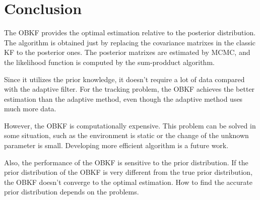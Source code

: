 \section{Conclusion}\label{sec:conclusion}

The OBKF provides the optimal estimation relative to the posterior distribution. The algorithm is obtained just by replacing the covariance matrixes in the classic KF to the posterior ones. The posterior matrixes are estimated by MCMC, and the likelihood function is computed by the sum-prodduct algorithm. 

Since it utilizes the prior knowledge, it doesn't require a lot of data compared with the adaptive filter. For the tracking problem, the OBKF achieves the better estimation than the adaptive method, even though the adaptive method uses much more data.

However, the OBKF is computationally expensive. This problem can be solved in some situation, such as the environment is static or the change of the unknown parameter is small. Developing more efficient algorithm is a future work.

Also, the performance of the OBKF is sensitive to the prior distribution. If the prior distribution of the OBKF is very different from the true prior distribution, the OBKF doesn't converge to the optimal estimation. How to find the accurate prior distribution depends on the problems.